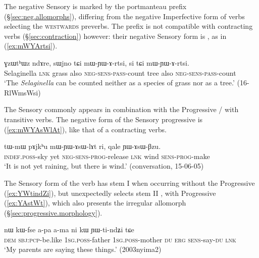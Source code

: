 The negative Sensory is marked by the portmanteau prefix  (§\ref{sec:neg.allomorphs}), differing from the negative Imperfective form  of verbs selecting the \textsc{westwards} preverbs. The  prefix is not compatible with contracting verbs (§\ref{sec:contraction}) however: their negative Sensory form is , as in (\ref{ex:mWYArtsi}).

\begin{exe}
\ex \label{ex:mWYArtsi}
\gll ɣzɯtʰɯz ndɤre, sɯjno tɕi mɯ-ɲɯ-ɤ-rtsi, si tɕi mɯ-ɲɯ-ɤ-rtsi. \\
Selaginella \textsc{lnk} grass also \textsc{neg}-\textsc{sens}-\textsc{pass}-count tree also \textsc{neg}-\textsc{sens}-\textsc{pass}-count \\
\glt `The \textit{Selaginella} can be counted neither as a species of grass nor as a tree.' (16-RlWmsWsi)
\end{exe}

The Sensory commonly appears in combination with the Progressive / with transitive verbs. The negative form of the Sensory progressive is  (\ref{ex:mWYAsWlAt}), like that of a contracting verbs.

\begin{exe}
\ex \label{ex:mWYAsWlAt}
\gll   tɯ-mɯ pɤjkʰu mɯ-ɲɯ-ɤsɯ-lɤt ri, qale ɲɯ-ɤsɯ-βzu.\\
\textsc{indef}.\textsc{poss}-sky yet \textsc{neg}-\textsc{sens}-\textsc{prog}-release \textsc{lnk} wind \textsc{sens}-\textsc{prog}-make\\
\glt `It is not yet raining, but there is wind.' (conversation, 15-06-05)
\end{exe}

The Sensory form of the verb  has stem I  when occurring without the Progressive (\ref{ex:YWtindZi}), but unexpectedly selects stem II ,  with Progressive (\ref{ex:YAstWt}), which also presents the irregular allomorph  (§\ref{sec:progressive.morphology}).
 

\begin{exe}
\ex \label{ex:YWtindZi}
\gll nɯ kɯ-fse a-pa a-ma ni kɯ ɲɯ-ti-ndʑi tɕe \\
\textsc{dem} \textsc{sbj}:\textsc{pcp}-be.like \textsc{1sg}.\textsc{poss}-father \textsc{1sg}.\textsc{poss}-mother \textsc{du} \textsc{erg} \textsc{sens}-say-\textsc{du} \textsc{lnk} \\
\glt `My parents are saying these things.' (2003nyima2)
\end{exe}

